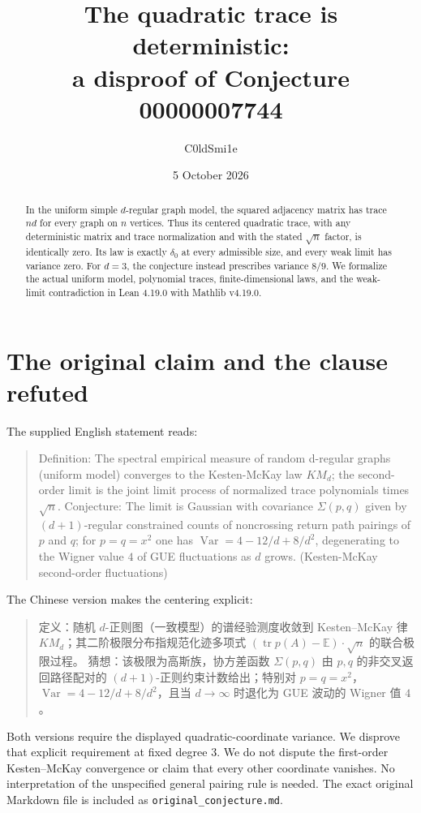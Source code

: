 \documentclass[11pt]{article}
\title{The quadratic trace is deterministic:\\a disproof of Conjecture 00000007744}
\author{C0ldSmi1e}
\date{5 October 2026}
\newcommand{\Var}{\operatorname{Var}}
\newcommand{\E}{\mathbb E}
\newcommand{\lean}[1]{\nolinkurl{#1}}
\begin{document}
\maketitle

\begin{abstract}
In the uniform simple $d$-regular graph model, the squared adjacency matrix has
trace $nd$ for every graph on $n$ vertices. Thus its centered quadratic trace,
with any deterministic matrix and trace normalization and with the stated
$\sqrt n$ factor, is identically zero. Its law is exactly $\delta_0$ at every
admissible size, and every weak limit has variance zero. For $d=3$, the
conjecture instead prescribes variance $8/9$. We formalize the actual uniform
model, polynomial traces, finite-dimensional laws, and the weak-limit
contradiction in Lean 4.19.0 with Mathlib v4.19.0.
\end{abstract}

\section{The original claim and the clause refuted}
The supplied English statement reads:
\begin{quote}\small
Definition: The spectral empirical measure of random d-regular graphs (uniform
model) converges to the Kesten-McKay law $KM_d$; the second-order limit is the
joint limit process of normalized trace polynomials times $\sqrt n$.
Conjecture: The limit is Gaussian with covariance $\Sigma(p,q)$ given by
$(d+1)$-regular constrained counts of noncrossing return path pairings of $p$
and $q$; for $p=q=x^2$ one has $\Var=4-12/d+8/d^2$, degenerating to the Wigner
value $4$ of GUE fluctuations as $d$ grows.
(Kesten-McKay second-order fluctuations)
\end{quote}
The Chinese version makes the centering explicit:
\begin{quote}\small
定义：随机 $d$-正则图（一致模型）的谱经验测度收敛到 Kesten--McKay 律
$KM_d$；其二阶极限分布指规范化迹多项式
$(\operatorname{tr}p(A)-\E)\cdot\sqrt n$ 的联合极限过程。
猜想：该极限为高斯族，协方差函数 $\Sigma(p,q)$ 由 $p,q$ 的非交叉返回路径配对的
$(d+1)$-正则约束计数给出；特别对 $p=q=x^2$，
$\Var=4-12/d+8/d^2$，且当 $d\to\infty$ 时退化为 GUE 波动的 Wigner 值 $4$。
\end{quote}
Both versions require the displayed quadratic-coordinate variance. We disprove
that explicit requirement at fixed degree $3$. We do not dispute the
first-order Kesten--McKay convergence or claim that every other coordinate
vanishes. No interpretation of the unspecified general pairing rule is needed.
The exact original Markdown file is included as \lean{original_conjecture.md}.
\end{document}
